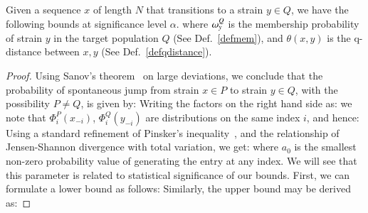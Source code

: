 {\begin{thm}\label{thmbnd}
Given a sequence  $x$ of length $N$ that transitions  to a strain $y\in Q$, we have the following bounds at significance level $\alpha$.
%
  where $\omega_{y}^Q$ is the membership probability of strain $y$ in the target population $Q$ (See Def.~\ref{defmem}), and $\theta(x,y)$ is the q-distance between $x,y$ (See Def.~\ref{defqdistance}).
\end{thm}
\begin{proof}
Using Sanov's theorem~\cite{cover} on large deviations, we conclude that the probability of spontaneous jump from strain $x\in P$ to strain $y\in Q$, with the possibility $P \neq Q$, is given by:
Writing the factors on the right hand side as:
%
we note that $\Phi^P_i(x_{-i})$, $\Phi^Q_i(y_{-i})$ are distributions on the same index $i$, and hence:
Using a standard refinement of Pinsker's inequality~\cite{fedotov2003refinements}, and the relationship of Jensen-Shannon divergence with  total variation, we get:
%
where $a_0$ is the smallest non-zero probability value of generating the entry at any index. We will see that this parameter is related to statistical significance of our bounds. First, we can formulate a lower bound as follows:
%
Similarly,  the upper bound may be derived as:
\end{proof}}
